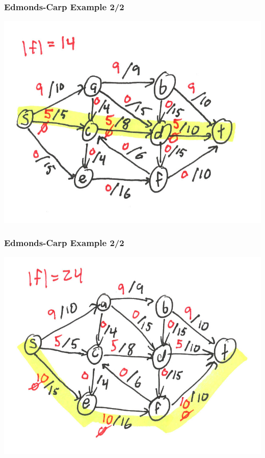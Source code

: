 \documentclass{beamer}
\begin{document}
\begin{frame} \frametitle{Edmonds-Carp Example 2/2}
\begin{center}
  \includegraphics[scale=1]{ek-2-3.png}
\end{center}
\end{frame}

\begin{frame} \frametitle{Edmonds-Carp Example 2/2}
\begin{center}
  \includegraphics[scale=1]{ek-2-4.png}
\end{center}
\end{frame}
\end{document}
